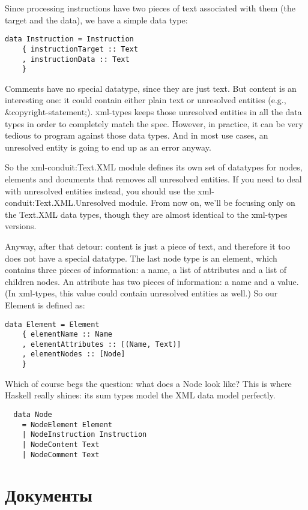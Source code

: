 Since processing instructions have two pieces of text associated with them (the target and the data), we have a simple data type:

\begin{lstlisting}
data Instruction = Instruction
    { instructionTarget :: Text
    , instructionData :: Text
    }
\end{lstlisting}

Comments have no special datatype, since they are just text. But content is an interesting one: it could contain either plain text or unresolved entities (e.g., &copyright-statement;).  xml-types keeps those unresolved entities in all the data types in order to completely match the spec. However, in practice, it can be very tedious to program against those data types. And in most use cases, an unresolved entity is going to end up as an error anyway.

So the xml-conduit:Text.XML module defines its own set of datatypes for nodes, elements and documents that removes all unresolved entities. If you need to deal with unresolved entities instead, you should use the xml-conduit:Text.XML.Unresolved module. From now on, we'll be focusing only on the Text.XML data types, though they are almost identical to the xml-types versions.

Anyway, after that detour: content is just a piece of text, and therefore it too does not have a special datatype. The last node type is an element, which contains three pieces of information: a name, a list of attributes and a list of children nodes. An attribute has two pieces of information: a name and a value. (In xml-types, this value could contain unresolved entities as well.) So our Element is defined as:

\begin{lstlisting}
data Element = Element
    { elementName :: Name
    , elementAttributes :: [(Name, Text)]
    , elementNodes :: [Node]
    }
\end{lstlisting}

Which of course begs the question: what does a Node look like? This is where Haskell really shines: its sum types model the XML data model perfectly.

\begin{lstlisting}
  data Node
    = NodeElement Element
    | NodeInstruction Instruction
    | NodeContent Text
    | NodeComment Text
\end{lstlisting}

\section{Документы} %
 
